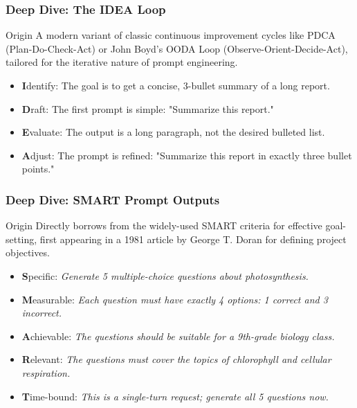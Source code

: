 \documentclass{beamer}
\begin{document}
\begin{frame}
    \frametitle{Deep Dive: The IDEA Loop}
	\begin{block}{Origin}
		A modern variant of classic continuous improvement cycles like PDCA (Plan-Do-Check-Act) or John Boyd's OODA Loop (Observe-Orient-Decide-Act), tailored for the iterative nature of prompt engineering.
	\end{block}
    \begin{itemize}
        \item \textbf{I}dentify: The goal is to get a concise, 3-bullet summary of a long report.
        \item \textbf{D}raft: The first prompt is simple: "Summarize this report."
        \item \textbf{E}valuate: The output is a long paragraph, not the desired bulleted list.
        \item \textbf{A}djust: The prompt is refined: "Summarize this report in exactly three bullet points."
    \end{itemize}
\end{frame}

\begin{frame}
    \frametitle{Deep Dive: SMART Prompt Outputs}
	\begin{block}{Origin}
		Directly borrows from the widely-used SMART criteria for effective goal-setting, first appearing in a 1981 article by George T. Doran for defining project objectives.
	\end{block}
    \begin{itemize}
        \item \textbf{S}pecific: \textit{Generate 5 multiple-choice questions about photosynthesis.}
        \item \textbf{M}easurable: \textit{Each question must have exactly 4 options: 1 correct and 3 incorrect.}
        \item \textbf{A}chievable: \textit{The questions should be suitable for a 9th-grade biology class.}
        \item \textbf{R}elevant: \textit{The questions must cover the topics of chlorophyll and cellular respiration.}
        \item \textbf{T}ime-bound: \textit{This is a single-turn request; generate all 5 questions now.}
    \end{itemize}
\end{frame}
\end{document}
